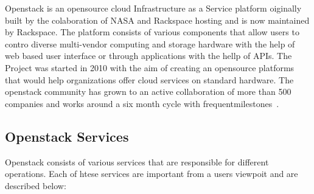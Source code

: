 Openstack is an opensource cloud Infrastructure as a Service platform
oiginally built by the colaboration of NASA and Rackspace hosting and
is now maintained by Rackspace. The platform consists of various
components that allow users to contro diverse multi-vendor computing
and storage hardware with the help of web based user interface or
through applications with the hellp of APIs.  The Project was started
in 2010 with the aim of creating an opensource platforms that would
help organizations offer cloud services on standard hardware. The
openstack community has grown to an active collaboration of more than
500 companies and works around a six month cycle with
frequentmilestones~\cite{hid-sp18-503-openstack-wiki}.

\subsection{Openstack Services}
Openstack consists of various services that are responsible for
different operations. Each of htese services are important from a
users viewpoit and are described below:

